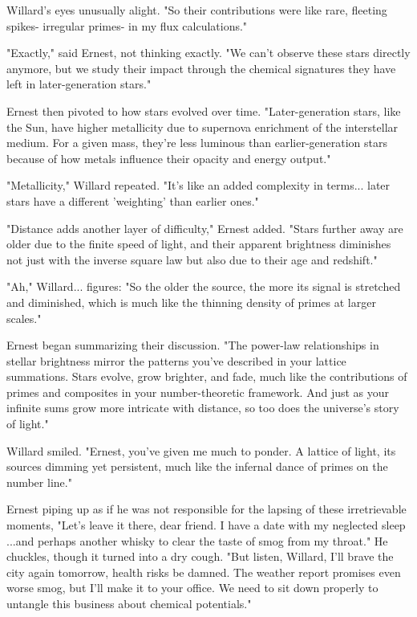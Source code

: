 Willard’s eyes unusually alight. "So their contributions were like rare, fleeting spikes- irregular primes- in my flux calculations."

"Exactly," said Ernest, not thinking exactly. "We can’t observe these stars directly anymore, but we study their impact through the chemical signatures they have left in later-generation stars."

Ernest then pivoted to how stars evolved over time. "Later-generation stars, like the Sun, have higher metallicity due to supernova enrichment of the interstellar medium. For a given mass, they’re less luminous than earlier-generation stars because of how metals influence their opacity and energy output."

"Metallicity," Willard repeated. "It’s like an added complexity in terms... later stars have a different 'weighting' than earlier ones."

"Distance adds another layer of difficulty," Ernest added. "Stars further away are older due to the finite speed of light, and their apparent brightness diminishes not just with the inverse square law but also due to their age and redshift."

"Ah," Willard... figures: "So the older the source, the more its signal is stretched and diminished, which is much like the thinning density of primes at larger scales."

Ernest began summarizing their discussion. "The power-law relationships in stellar brightness mirror the patterns you’ve described in your lattice summations. Stars evolve, grow brighter, and fade, much like the contributions of primes and composites in your number-theoretic framework. And just as your infinite sums grow more intricate with distance, so too does the universe’s story of light."

Willard smiled. "Ernest, you’ve given me much to ponder. A lattice of light, its sources dimming yet persistent, much like the infernal dance of primes on the number line."

Ernest piping up as if he was not responsible for the lapsing of these irretrievable moments, "Let's leave it there, dear friend. I have a date with my neglected sleep ...and perhaps another whisky to clear the taste of smog from my throat." He chuckles, though it turned into a dry cough. "But listen, Willard, I’ll brave the city again tomorrow, health risks be damned. The weather report promises even worse smog, but I’ll make it to your office. We need to sit down properly to untangle this business about chemical potentials."

